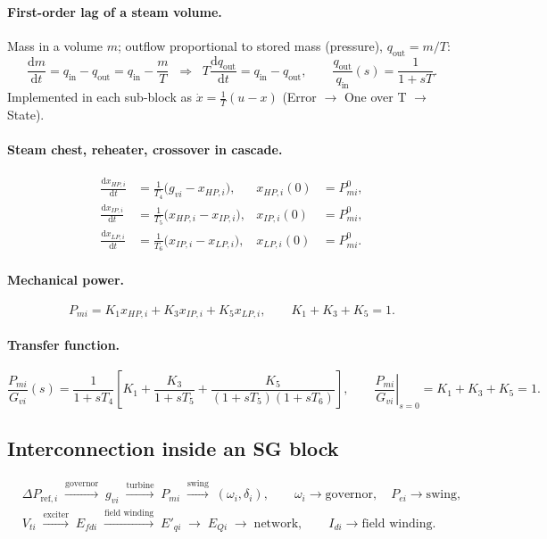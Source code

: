 \documentclass[11pt,a4paper]{article}
\numberwithin{equation}{section}
\newcommand{\dd}{\mathrm{d}}
\newcommand{\blk}[1]{\textsf{#1}}
\begin{document}
\paragraph{First-order lag of a steam volume.}
Mass in a volume $m$; outflow proportional to stored mass (pressure), $q_{\text{out}} = m/T$:
\begin{equation}
\frac{\dd m}{\dd t} = q_{\text{in}} - q_{\text{out}} = q_{\text{in}} - \frac{m}{T}
\;\;\Longrightarrow\;\;
T\frac{\dd q_{\text{out}}}{\dd t} = q_{\text{in}} - q_{\text{out}},
\qquad
\frac{q_{\text{out}}}{q_{\text{in}}}(s) = \frac{1}{1+sT}.
\end{equation}
Implemented in each sub-block as $\dot x = \frac{1}{T}(u - x)$ (\blk{Error} $\to$ \blk{One over T} $\to$ \blk{State}).

\paragraph{Steam chest, reheater, crossover in cascade.}
\begin{align}
\frac{\dd x_{HP,i}}{\dd t} &= \frac{1}{T_4}\big(g_{vi} - x_{HP,i}\big), & x_{HP,i}(0)&=P_{mi}^0,\\
\frac{\dd x_{IP,i}}{\dd t} &= \frac{1}{T_5}\big(x_{HP,i} - x_{IP,i}\big), & x_{IP,i}(0)&=P_{mi}^0,\\
\frac{\dd x_{LP,i}}{\dd t} &= \frac{1}{T_6}\big(x_{IP,i} - x_{LP,i}\big), & x_{LP,i}(0)&=P_{mi}^0.
\end{align}
\paragraph{Mechanical power.}
\begin{equation}
\boxed{P_{mi} = K_1 x_{HP,i} + K_3 x_{IP,i} + K_5 x_{LP,i},\qquad K_1+K_3+K_5 = 1.}
\end{equation}
\paragraph{Transfer function.}
\begin{equation}
\frac{P_{mi}}{G_{vi}}(s) = \frac{1}{1+sT_4}\left[K_1 + \frac{K_3}{1+sT_5} + \frac{K_5}{(1+sT_5)(1+sT_6)}\right],
\qquad
\left.\frac{P_{mi}}{G_{vi}}\right|_{s=0} = K_1+K_3+K_5 = 1 .
\end{equation}

\subsection{Interconnection inside an SG block}
\begin{align}
&\Delta P_{\text{ref},i}\;\xrightarrow{\text{governor}}\; g_{vi}\;\xrightarrow{\text{turbine}}\;P_{mi}\;\xrightarrow{\text{swing}}\;(\omega_i,\delta_i),
\qquad \omega_i\to\text{governor},\quad P_{ei}\to\text{swing},\\
&V_{ti}\;\xrightarrow{\text{exciter}}\;E_{fdi}\;\xrightarrow{\text{field winding}}\;E'_{qi}\;\to\;E_{Qi}\;\to\;\text{network},
\qquad I_{di}\to\text{field winding}.
\end{align}
\end{document}
